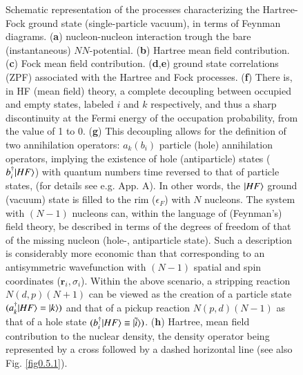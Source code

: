 \begin{figure}[h!]
	\caption{Schematic representation of the processes characterizing the Hartree-Fock ground state (single-particle vacuum), in terms of Feynman diagrams. (\textbf{a}) nucleon-nucleon interaction trough the bare (instantaneous) $NN$-potential. (\textbf{b}) Hartree mean field contribution. (\textbf{c}) Fock mean field contribution. (\textbf{d},\textbf{e}) ground state correlations (ZPF) associated with the Hartree and Fock processes. (\textbf{f}) There is, in HF (mean field) theory, a complete decoupling between occupied and empty states, labeled $i$ and $k$ respectively, and thus a sharp discontinuity at the Fermi energy of the occupation probability, from the value of 1 to 0. (\textbf{g}) This decoupling allows for the definition of two annihilation operators: $a_k(b_i)$ particle (hole) annihilation operators,   implying the existence of hole (antiparticle) states ($b^\dagger_i|{HF} \rangle$) with quantum numbers time reversed to that of particle states, (for details see e.g. \cite{Brink:05} App. A). In other words, the $|{HF} \rangle$ ground (vacuum) state is filled to the rim ($\epsilon_F$) with $N$ nucleons. The system with $(N-1)$ nucleons can, within the language of (Feynman's) field theory, be described in terms of the degrees of freedom of that of the missing nucleon (hole-, antiparticle state). Such a description is  considerably more economic than that corresponding to an antisymmetric wavefunction with $(N-1)$ spatial and spin coordinates ($\mathbf r_i,\sigma_i$). Within the above scenario, a stripping reaction $N(d,p)(N+1)$ can be viewed as the creation of a particle state $(a^\dagger_k|{HF} \rangle=|{k} \rangle)$ and that of a pickup reaction $N(p,d)(N-1)$ as that of a hole state $(b^\dagger_i|{HF} \rangle\equiv|{\tilde i} \rangle)$. (\textbf{h}) Hartree, mean field contribution to the  nuclear density, the density operator being represented by a cross followed by a dashed horizontal line (see also Fig. \ref{fig0.5.1}).}
	\label{fig1.0.6}
\end{figure}
